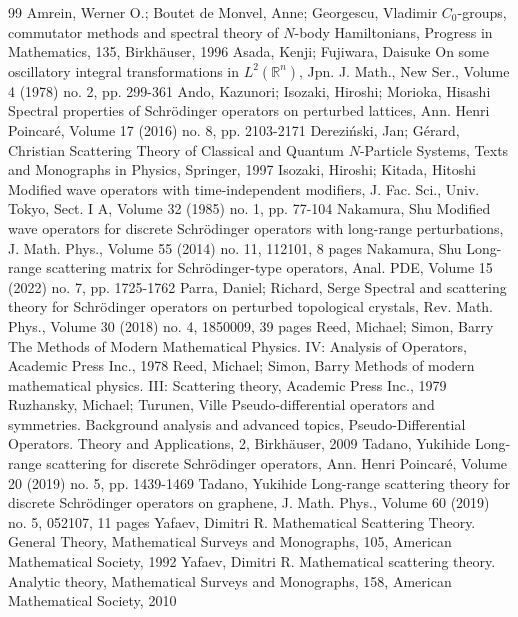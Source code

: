 \begin{thebibliography}{99}
 Amrein, Werner O.; Boutet de Monvel, Anne; Georgescu, Vladimir ${C}_0$-groups, commutator methods and spectral theory of ${N}$-body Hamiltonians, Progress in Mathematics, 135, Birkhäuser, 1996
 Asada, Kenji; Fujiwara, Daisuke On some oscillatory integral transformations in ${L}^2(\mathbb{R}^n)$, Jpn. J. Math., New Ser., Volume 4 (1978) no. 2, pp. 299-361
 Ando, Kazunori; Isozaki, Hiroshi; Morioka, Hisashi Spectral properties of Schrödinger operators on perturbed lattices, Ann. Henri Poincaré, Volume 17 (2016) no. 8, pp. 2103-2171
 Dereziński, Jan; Gérard, Christian Scattering Theory of Classical and Quantum ${N}$-Particle Systems, Texts and Monographs in Physics, Springer, 1997
 Isozaki, Hiroshi; Kitada, Hitoshi Modified wave operators with time-independent modifiers, J. Fac. Sci., Univ. Tokyo, Sect. I A, Volume 32 (1985) no. 1, pp. 77-104
 Nakamura, Shu Modified wave operators for discrete Schrödinger operators with long-range perturbations, J. Math. Phys., Volume 55 (2014) no. 11, 112101, 8 pages
 Nakamura, Shu Long-range scattering matrix for Schrödinger-type operators, Anal. PDE, Volume 15 (2022) no. 7, pp. 1725-1762
 Parra, Daniel; Richard, Serge Spectral and scattering theory for Schrödinger operators on perturbed topological crystals, Rev. Math. Phys., Volume 30 (2018) no. 4, 1850009, 39 pages
 Reed, Michael; Simon, Barry The Methods of Modern Mathematical Physics. IV: Analysis of Operators, Academic Press Inc., 1978
 Reed, Michael; Simon, Barry Methods of modern mathematical physics. III: Scattering theory, Academic Press Inc., 1979
 Ruzhansky, Michael; Turunen, Ville Pseudo-differential operators and symmetries. Background analysis and advanced topics, Pseudo-Differential Operators. Theory and Applications, 2, Birkhäuser, 2009
 Tadano, Yukihide Long-range scattering for discrete Schrödinger operators, Ann. Henri Poincaré, Volume 20 (2019) no. 5, pp. 1439-1469
 Tadano, Yukihide Long-range scattering theory for discrete Schrödinger operators on graphene, J. Math. Phys., Volume 60 (2019) no. 5, 052107, 11 pages
 Yafaev, Dimitri R. Mathematical Scattering Theory. General Theory, Mathematical Surveys and Monographs, 105, American Mathematical Society, 1992
 Yafaev, Dimitri R. Mathematical scattering theory. Analytic theory, Mathematical Surveys and Monographs, 158, American Mathematical Society, 2010
\end{thebibliography}
